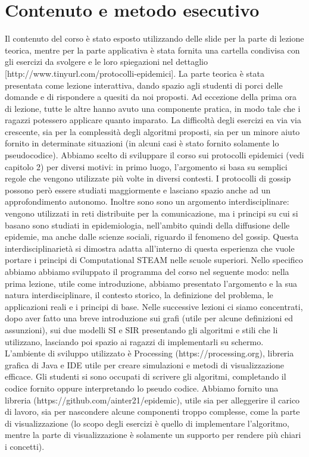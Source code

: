 \section{Contenuto e metodo esecutivo} 
Il contenuto del corso è stato esposto utilizzando delle slide per la parte di lezione teorica, mentre per la parte applicativa è stata fornita una cartella condivisa con gli esercizi da svolgere e le loro spiegazioni nel dettaglio [http://www.tinyurl.com/protocolli-epidemici]. La parte teorica è stata presentata come lezione interattiva, dando spazio agli studenti di porci delle domande e di rispondere a quesiti da noi proposti. Ad eccezione della prima ora di lezione, tutte le altre hanno avuto una componente pratica, in modo tale che i ragazzi potessero applicare quanto imparato. La difficoltà degli esercizi ea via via crescente, sia per la complessità degli algoritmi proposti, sia per un minore aiuto fornito in determinate situazioni (in alcuni casi è stato fornito solamente lo pseudocodice). 
Abbiamo scelto di sviluppare il corso sui protocolli epidemici (vedi capitolo 2) per diversi motivi: in primo luogo, l’argomento si basa su semplici regole che vengono utilizzate più volte in diversi contesti. I protocolli di gossip possono però essere studiati maggiormente e lasciano spazio anche ad un approfondimento autonomo. Inoltre sono sono un argomento interdisciplinare: vengono utilizzati in reti distribuite per la comunicazione, ma i principi su cui si basano sono studiati in epidemiologia, nell’ambito quindi della diffusione delle epidemie, ma anche dalle scienze sociali, riguardo il fenomeno del gossip. Questa interdisciplinarietà si dimostra adatta all’interno di questa esperienza che vuole portare i principi di Computational STEAM nelle scuole superiori.
Nello specifico abbiamo abbiamo sviluppato il programma del corso nel seguente modo: nella prima lezione, utile come introduzione, abbiamo presentato l’argomento e la sua natura interdisciplinare, il contesto storico, la definizione del problema, le applicazioni reali e i principi di base.
Nelle successive lezioni ci siamo concentrati, dopo aver fatto una breve introduzione sui grafi (utile per alcune definizioni ed assunzioni), sui due modelli SI e SIR presentando gli algoritmi e stili che li utilizzano, lasciando poi spazio ai ragazzi di implementarli su schermo. L’ambiente di sviluppo utilizzato è Processing (https://processing.org), libreria grafica di Java e IDE utile per creare simulazioni e metodi di visualizzazione efficace. Gli studenti si sono occupati di scrivere gli algoritmi, completando il codice fornito oppure interpretando lo pseudo codice. Abbiamo fornito una libreria (https://github.com/ainter21/epidemic), utile sia per alleggerire il carico di lavoro, sia per nascondere alcune componenti troppo complesse, come la parte di visualizzazione (lo scopo degli esercizi è quello di implementare l’algoritmo, mentre la parte di visualizzazione è solamente un supporto per rendere più chiari i concetti).
